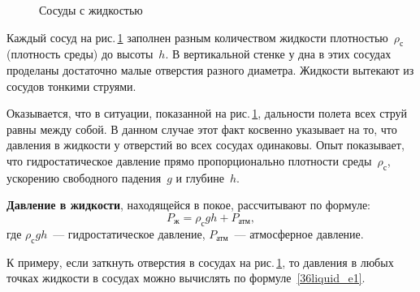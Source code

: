 \documentclass[main.tex]{subfiles}
\begin{document}
\begin{figure}[H]
\caption{Сосуды с жидкостью}
\label{fig:p51}
\end{figure}

Каждый сосуд на рис.\,\ref{fig:p51} заполнен разным количеством жидкости плотностью~$\rho_\text{с}$ (плотность среды) до высоты~$h$. В вертикальной стенке у дна в этих сосудах проделаны достаточно малые отверстия разного диаметра. Жидкости вытекают из сосудов тонкими струями.

Оказывается, что в ситуации, показанной на рис.\,\ref{fig:p51}, дальности полета всех струй равны между собой. В данном случае этот факт косвенно указывает на то, что давления в жидкости у отверстий во всех сосудах одинаковы. Опыт показывает, что гидростатическое давление прямо пропорционально плотности среды~$\rho_\text{с}$, ускорению свободного падения~$g$ и глубине~$h$. 

\textbf{Давление в жидкости}, находящейся в покое, рассчитывают по формуле:
\begin{equation}\label{36liquid_e1}
    P_\text{ж}=\rho_\text{с}gh+P_\text{атм},
\end{equation}
где $\rho_\text{с}gh$~--- гидростатическое давление, $P_\text{атм}$~--- атмосферное давление.

К примеру, если заткнуть отверстия в сосудах на рис.\,\ref{fig:p51}, то давления в любых точках жидкости в сосудах можно вычислять по формуле~\eqref{36liquid_e1}.
\end{document}
